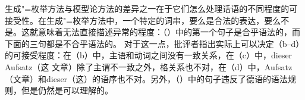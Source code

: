 生成"=枚举方法与模型论方法的差异之一在于它们怎么处理话语的不同程度的可接受性。在生成"=枚举方法中，一个特定的词串，要么是合法的表达，要么不是。这就意味着无法直接描述异常的程度：（）中的第一个句子是合乎语法的，而下面的三句都是不合乎语法的。
\eal
{}
\zl
对于这一点，批评者指出实际上可以决定（b--d）的可接受程度：在（b）中，主语和动词之间没有一致关系，在（c）中，dieser Aufsatz（这 文章）除了主谓不一致之外，格关系也不对，在（d）中，Aufsatz（文章）和dieser（这）的语序也不对。另外，（）中的句子违反了德语的语法规则，但是仍然是可以理解的。
